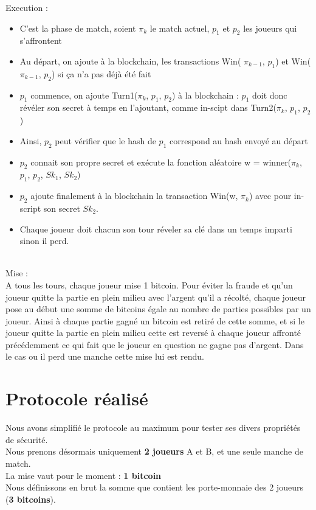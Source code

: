 \documentclass[conference]{IEEEtran}
\begin{document}
Execution :  \\
\begin{itemize}
\item C'est la phase de match, soient $\pi_{k}$ le match actuel, $p_{1}$ et $p_{2}$ les joueurs qui s'affrontent
\item Au départ, on ajoute à la blockchain, les transactions Win( $\pi_{k-1}$, $p_{1}$) et Win( $\pi_{k-1}$, $p_{2}$) si ça n'a pas déjà été fait
\item $p_{1}$ commence, on ajoute Turn1($\pi_{k}$, $p_{1}$, $p_{2}$) à la blockchain :  $p_{1}$ doit donc révéler son secret à temps en l'ajoutant, comme in-scipt dans Turn2($\pi_{k}$, $p_{1}$, $p_{2}$)
\item Ainsi, $p_{2}$ peut vérifier que le hash de $p_{1}$ correspond au hash envoyé au départ
\item $p_{2}$ connait son propre secret et exécute la fonction aléatoire w = winner($\pi_{k}$, $p_{1}$, $p_{2}$, $Sk_{1}$, $Sk_{2}$)
\item $p_{2}$ ajoute finalement à la blockchain la transaction Win(w, $\pi_{k}$) avec pour in-script son secret $Sk_{2}$.
\item Chaque joueur doit chacun son tour réveler sa clé dans un temps imparti sinon il perd. \\
\end{itemize}
\\
Mise : \\
 A tous les tours, chaque joueur mise 1 bitcoin. Pour éviter la fraude et qu'un joueur quitte la partie en plein milieu avec l'argent qu'il a récolté, chaque joueur pose au début une somme de bitcoins égale au nombre de parties possibles par un joueur. Ainsi à chaque partie gagné un bitcoin est retiré de cette somme, et si le joueur quitte la partie en plein milieu cette est reversé à chaque joueur affronté précédemment ce qui fait que le joueur en question ne gagne pas d'argent. Dans le cas ou il perd une manche cette mise lui est rendu.

\section{Protocole réalisé}
Nous avons simplifié le protocole au maximum pour tester ses divers propriétés de sécurité. \\
Nous prenons désormais uniquement \textbf{2 joueurs} A et B, et une seule manche de match. \\
La mise vaut pour le moment : \textbf{1 bitcoin} \\
Nous définissons en brut la somme que contient les porte-monnaie des 2 joueurs (\textbf{3 bitcoins}). 
\end{document}
